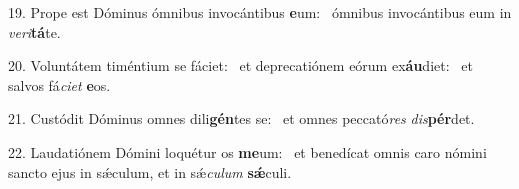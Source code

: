 19. Prope est Dóminus ómnibus invocántibus \textbf{e}um: \ast\  ómnibus invocántibus eum in \textit{ve}\textit{ri}\textbf{tá}te.\

20. Voluntátem timéntium se fáciet: \dag\  et deprecatiónem eórum ex\textbf{áu}diet: \ast\  et salvos fá\textit{ci}\textit{et} \textbf{e}os.\

21. Custódit Dóminus omnes dili\textbf{gén}tes se: \ast\  et omnes peccató\textit{res} \textit{dis}\textbf{pér}det.\

22. Laudatiónem Dómini loquétur os \textbf{me}um: \ast\  et benedícat omnis caro nómini sancto ejus in sǽculum, et in sǽ\textit{cu}\textit{lum} \textbf{sǽ}culi.\

